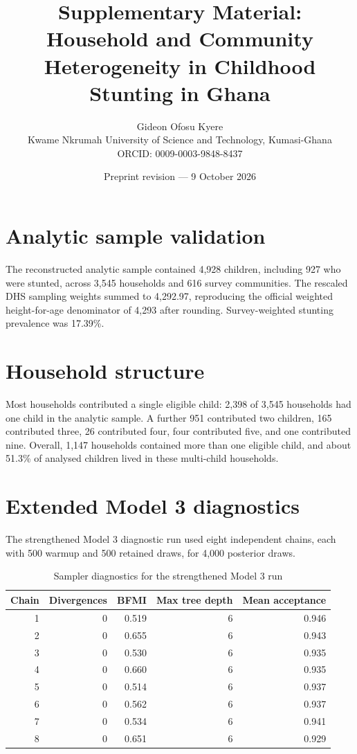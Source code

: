 \documentclass[10pt]{article}
\title{Supplementary Material: Household and Community Heterogeneity in Childhood Stunting in Ghana}
\author{Gideon Ofosu Kyere\\\small Kwame Nkrumah University of Science and Technology, Kumasi-Ghana\\\small ORCID: 0009-0003-9848-8437}
\date{Preprint revision --- 9 October 2026}
\begin{document}
\maketitle

\section{Analytic sample validation}

The reconstructed analytic sample contained 4,928 children, including 927 who were stunted, across 3,545 households and 616 survey communities. The rescaled DHS sampling weights summed to 4,292.97, reproducing the official weighted height-for-age denominator of 4,293 after rounding. Survey-weighted stunting prevalence was 17.39\%.

\section{Household structure}

Most households contributed a single eligible child: 2,398 of 3,545 households had one child in the analytic sample. A further 951 contributed two children, 165 contributed three, 26 contributed four, four contributed five, and one contributed nine. Overall, 1,147 households contained more than one eligible child, and about 51.3\% of analysed children lived in these multi-child households.

\section{Extended Model 3 diagnostics}

The strengthened Model 3 diagnostic run used eight independent chains, each with 500 warmup and 500 retained draws, for 4,000 posterior draws.

\begin{table}[H]
\centering
\caption{Sampler diagnostics for the strengthened Model 3 run}
\begin{tabular}{rrrrr}
\toprule
Chain & Divergences & BFMI & Max tree depth & Mean acceptance \\
\midrule
1 & 0 & 0.519 & 6 & 0.946 \\
2 & 0 & 0.655 & 6 & 0.943 \\
3 & 0 & 0.530 & 6 & 0.935 \\
4 & 0 & 0.660 & 6 & 0.935 \\
5 & 0 & 0.514 & 6 & 0.937 \\
6 & 0 & 0.562 & 6 & 0.937 \\
7 & 0 & 0.534 & 6 & 0.941 \\
8 & 0 & 0.651 & 6 & 0.929 \\
\bottomrule
\end{tabular}
\end{table}
\end{document}
